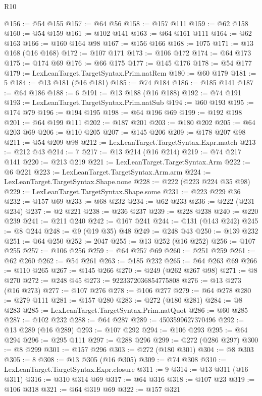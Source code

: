 \begin{lexlean}{R10}
\begin{coremodule}
@156 := @54 @155
@157 := @64 @56
@158 := @157 @111
@159 := @62 @158
@160 := @54 @159
@161 := @102 @141
@163 := @64 @161 @111
@164 := @62 @163
@166 := @160 @164 @98
@167 := @156 @166
@168 := 1075
@171 := @13 @168 (@16 @168)
@172 := @107 @171
@173 := @106 @172
@174 := @64 @173
@175 := @174 @69
@176 := @66 @175
@177 := @145 @176
@178 := @54 @177
@179 := LexLeanTarget.TargetSyntax.Prim.natRem
@180 := @60 @179
@181 := 5
@184 := @13 @181 (@16 @181)
@185 := @74 @184
@186 := @185 @141
@187 := @64 @186
@188 := 6
@191 := @13 @188 (@16 @188)
@192 := @74 @191
@193 := LexLeanTarget.TargetSyntax.Prim.natSub
@194 := @60 @193
@195 := @174 @79
@196 := @194 @195
@198 := @64 @196 @69
@199 := @192 @198
@201 := @64 @199 @111
@202 := @187 @201
@203 := @180 @202
@205 := @64 @203 @69
@206 := @110 @205
@207 := @145 @206
@209 := @178 @207 @98
@211 := @54 @209 @98
@212 := LexLeanTarget.TargetSyntax.Expr.match
@213 := @212 @43
@214 := 7
@217 := @13 @214 (@16 @214)
@219 := @74 @217 @141
@220 := @213 @219
@221 := LexLeanTarget.TargetSyntax.Arm
@222 := @6 @221
@223 := LexLeanTarget.TargetSyntax.Arm.arm
@224 := LexLeanTarget.TargetSyntax.Shape.none
@228 := @222 (@223 @224 @35 @98)
@229 := LexLeanTarget.TargetSyntax.Shape.some
@231 := @223 @229 @36
@232 := @157 @69
@233 := @68 @232
@234 := @62 @233
@236 := @222 (@231 @234)
@237 := @2 @221
@238 := @236 @237
@239 := @228 @238
@240 := @220 @239
@241 := @211 @240
@242 := @167 @241
@244 := @131 (@143 @242)
@245 := @8 @244
@248 := @9 (@19 @35) @48
@249 := @248 @43
@250 := @139 @232
@251 := @64 @250
@252 := 2047
@255 := @13 @252 (@16 @252)
@256 := @107 @255
@257 := @106 @256
@259 := @64 @257 @69
@260 := @251 @259
@261 := @62 @260
@262 := @54 @261
@263 := @185 @232
@265 := @64 @263 @69
@266 := @110 @265
@267 := @145 @266
@270 := @249 (@262 @267 @98)
@271 := @8 @270
@272 := @248 @45
@273 := 9223372036854775808
@276 := @13 @273 (@16 @273)
@277 := @107 @276
@278 := @106 @277
@279 := @64 @278
@280 := @279 @111
@281 := @157 @280
@283 := @272 (@180 @281)
@284 := @8 @283
@285 := LexLeanTarget.TargetSyntax.Prim.natQuot
@286 := @60 @285
@287 := @102 @232
@288 := @64 @287
@289 := 4503599627370496
@292 := @13 @289 (@16 @289)
@293 := @107 @292
@294 := @106 @293
@295 := @64 @294
@296 := @295 @111
@297 := @288 @296
@299 := @272 (@286 @297)
@300 := @8 @299
@301 := @157 @296
@303 := @272 (@180 @301)
@304 := @8 @303
@305 := 8
@308 := @13 @305 (@16 @305)
@309 := @74 @308
@310 := LexLeanTarget.TargetSyntax.Expr.closure
@311 := 9
@314 := @13 @311 (@16 @311)
@316 := @310 @314 @69
@317 := @64 @316
@318 := @107 @23
@319 := @106 @318
@321 := @64 @319 @69
@322 := @157 @321

\end{coremodule}
\end{lexlean}
